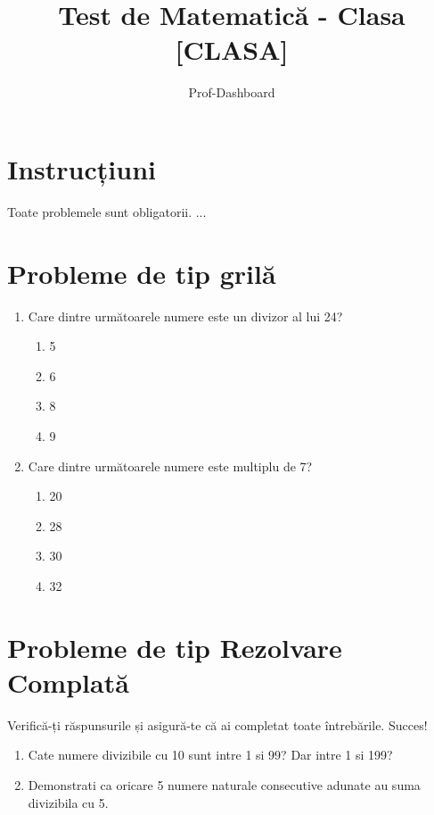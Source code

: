 \documentclass[a4paper,12pt]{article}
\title{Test de Matematică - Clasa [CLASA]}
\author{Prof-Dashboard}
\date{}
\begin{document}
\maketitle

\section*{Instrucțiuni}
Toate problemele sunt obligatorii. ...

\section*{Probleme de tip grilă} %

\begin{enumerate}[label=\textbf{G\arabic*:}]
    \item Care dintre următoarele numere este un divizor al lui 24? %
    \begin{enumerate}
        \item 5
        \item 6
        \item 8
        \item 9
    \end{enumerate}
    
    \item Care dintre următoarele numere este multiplu de 7? %
    \begin{enumerate}
        \item 20
        \item 28
        \item 30
        \item 32
    \end{enumerate}
\end{enumerate}

\section*{Probleme de tip Rezolvare Complată}
Verifică-ți răspunsurile și asigură-te că ai completat toate întrebările. Succes!

\begin{enumerate}[label=\textbf{P\arabic*:}]
    \item Cate numere divizibile cu 10 sunt intre 1 si 99? Dar intre 1 si 199? %
    
    \item Demonstrati ca oricare 5 numere naturale consecutive adunate au suma divizibila cu 5.
\end{enumerate}
\end{document}
